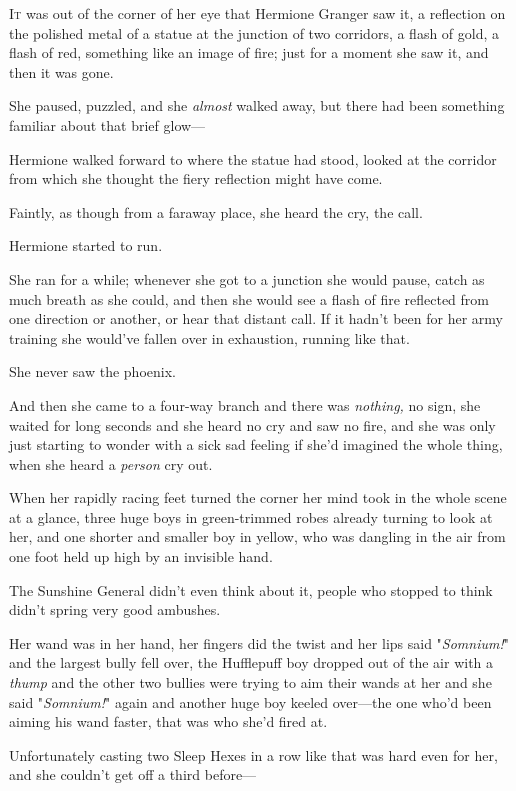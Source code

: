 
\lettrine{I}{t} was out of the 
corner of her eye that Hermione Granger saw it, a reflection on the polished 
metal of a statue at the junction of two corridors, a flash of gold, a flash of 
red, something like an image of fire; just for a moment she saw it, and then it 
was gone.

She paused, puzzled, and she \emph{almost} walked away, but there had been 
something familiar about that brief glow---

Hermione walked forward to where the statue had stood, looked at the corridor 
from which she thought the fiery reflection might have come.

Faintly, as though from a faraway place, she heard the cry, the call.

Hermione started to run.

She ran for a while; whenever she got to a junction she would pause, catch as 
much breath as she could, and then she would see a flash of fire reflected from 
one direction or another, or hear that distant call. If it hadn't been for her 
army training she would've fallen over in exhaustion, running like that.

She never saw the phoenix.

And then she came to a four-way branch and there was \emph{nothing,} no sign, 
she waited for long seconds and she heard no cry and saw no fire, and she was 
only just starting to wonder with a sick sad feeling if she'd imagined the 
whole thing, when she heard a \emph{person} cry out.

When her rapidly racing feet turned the corner her mind took in the whole scene 
at a glance, three huge boys in green-trimmed robes already turning to look at 
her, and one shorter and smaller boy in yellow, who was dangling in the air 
from one foot held up high by an invisible hand.

The Sunshine General didn't even think about it, people who stopped to think 
didn't spring very good ambushes.

Her wand was in her hand, her fingers did the twist and her lips said 
"\emph{Somnium!}" and the largest bully fell over, the Hufflepuff boy dropped 
out of the air with a \emph{thump} and the other two bullies were trying to aim 
their wands at her and she said "\emph{Somnium!}" again and another huge boy 
keeled over---the one who'd been aiming his wand faster, that was who she'd 
fired at.

Unfortunately casting two Sleep Hexes in a row like that was hard even for her, 
and she couldn't get off a third before---

